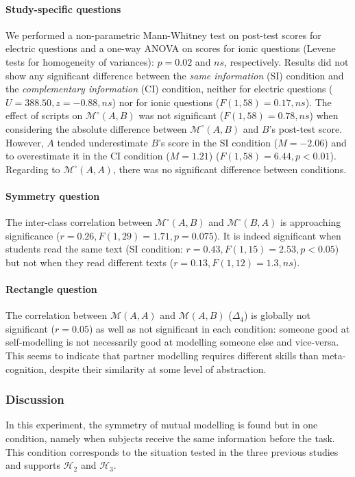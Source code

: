 \documentclass[natbib]{svjour3}
\newcommand{\gmodel}[2]{{$\mathcal{M}(#1, #2)$}}
\newcommand{\gModel}[2]{{$\mathcal{M}^{\circ}(#1, #2)$}}
\begin{document}
\paragraph{Study-specific questions} We performed a non-parametric Mann-Whitney
test on post-test scores for electric questions and a one-way ANOVA on scores
for ionic questions (Levene tests for homogeneity of variances): $p = 0.02$ and
$ns$, respectively. Results  did not show any significant difference between the
\emph{same information} (SI) condition and the \emph{complementary information}
(CI) condition, neither for electric questions ($U = 388.50, z = -0.88, ns$) nor
for ionic questions ($F(1, 58) = 0.17, ns$).  The effect of scripts on
\gModel{A}{B} was not significant ($F(1, 58) = 0.78, ns$) when considering the
absolute difference between \gModel{A}{B} and $B$'s post-test score. However, $A$
tended underestimate $B$'s score in the SI condition ($M = -2.06$) and to
overestimate it in the CI condition ($M = 1.21$) ($F(1, 58) = 6.44, p<0.01$).
Regarding to \gModel{A}{A}, there was no significant difference between
conditions.

\paragraph{Symmetry question} The inter-class correlation between \gModel{A}{B}
and \gModel{B}{A} is approaching significance ($r= 0.26, F(1,29)=1.71, p=
0.075$). It is indeed significant when students read the same text (SI
condition: $r=0.43, F(1,15)=2.53, p<0.05$) but not when they read different texts
($r= 0.13, F(1,12)=1.3, ns$). 

\paragraph{Rectangle question} The correlation between \gmodel{A}{A}
and \gmodel{A}{B} ($\Delta_4$) is globally not significant ($r=0.05$) as well as not
significant in each condition: someone good at self-modelling is not necessarily
good at modelling someone else and vice-versa.  This seems to indicate that partner modelling
requires different skills than meta-cognition, despite their similarity at some level of abstraction.

\subsubsection*{Discussion}

In this experiment, the symmetry of mutual modelling is  found but  in one condition, namely when subjects
 receive the same information before the task.  This condition corresponds to the situation tested in the three
previous studies and supports  $\mathcal{H}_{2}$ and  $\mathcal{H}_{3}$. 
\end{document}
